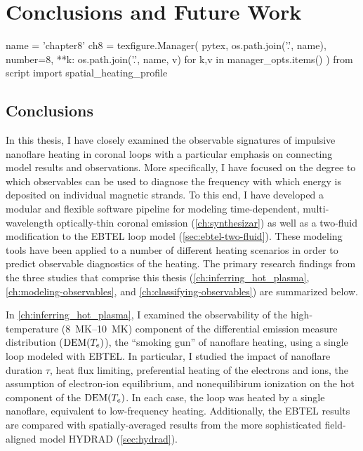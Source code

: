 \chapter{Conclusions and Future Work}\label{ch:conclusions}

\begin{pycode}[chapter8]
name = 'chapter8'
ch8 = texfigure.Manager(
    pytex,
    os.path.join('.', name),
    number=8,
    **{k: os.path.join('.', name, v) for k,v in manager_opts.items()}
)
from script import spatial_heating_profile
\end{pycode}

\section{Conclusions}\label{sec:conclusions}

In this thesis, I have closely examined the observable signatures of impulsive nanoflare heating in \AR{} coronal loops with a particular emphasis on connecting model results and observations. More specifically, I have focused on the degree to which observables can be used to diagnose the frequency with which energy is deposited on individual magnetic strands. To this end, I have developed a modular and flexible software pipeline for modeling time-dependent, multi-wavelength optically-thin coronal emission (\autoref{ch:synthesizar}) as well as a two-fluid modification to the EBTEL loop model (\autoref{sec:ebtel-two-fluid}). These modeling tools have been applied to a number of different heating scenarios in order to predict observable diagnostics of the heating. The primary research findings from the three studies that comprise this thesis (\autoref{ch:inferring_hot_plasma}, \autoref{ch:modeling-observables}, and \autoref{ch:classifying-observables}) are summarized below.

In \autoref{ch:inferring_hot_plasma}, I examined the observability of the high-temperature (\SIrange{8}{10}{\mega\kelvin}) component of the differential emission measure distribution ($\textup{DEM}(T_e)$), the ``smoking gun'' of nanoflare heating, using a single loop modeled with EBTEL. In particular, I studied the impact of nanoflare duration $\tau$, heat flux limiting, preferential heating of the electrons and ions, the assumption of electron-ion equilibrium, and nonequilibirum ionization on the hot component of the $\textup{DEM}(T_e)$. In each case, the loop was heated by a single nanoflare, equivalent to low-frequency heating. Additionally, the EBTEL results are compared with spatially-averaged results from the more sophisticated field-aligned model HYDRAD (\autoref{sec:hydrad}).

